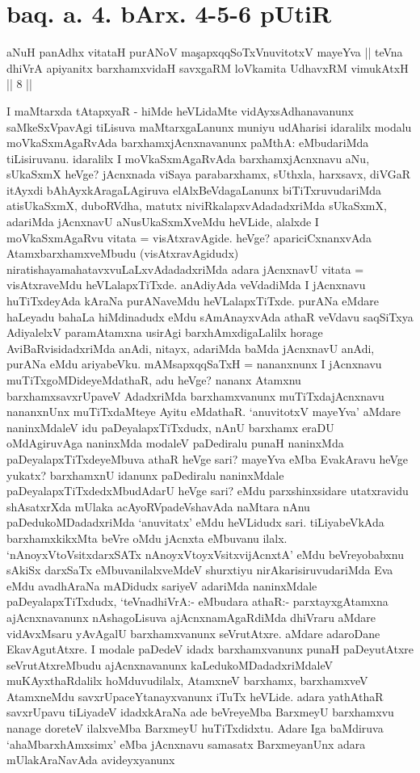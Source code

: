 \section*{baq. a. 4. bArx. 4-5-6 pUtiR}


\begin{shl}
aNuH panAdhx vitataH purANoV ma\c sapxqqSoTxV\s nuvitotxV mayeYva ||
teVna dhiVrA apiyanitx barxhamxvidaH savxgaRM loVkamita UdhavxRM vimukAtxH || 8 ||
\end{shl}

\begin{artha}
I maMtarxda tAtapxyaR - hiMde heVLidaMte vidAyxsAdhanavanunx saMkeSxVpavAgi tiLisuva maMtarxgaLanunx muniyu udAharisi idaralilx modalu moVkaSxmAgaRvAda barxhamxjAcnxnavanunx paMthA: eMbudariMda tiLisiruvanu. idaralilx I moVkaSxmAgaRvAda barxhamxjAcnxnavu aNu, sUkaSxmX heVge? jAcnxnada viSaya parabarxhamx, sUthxla, harxsavx, diVGaR itAyxdi bAhAyxkAragaLAgiruva elAlxBeVdagaLanunx biTiTxruvudariMda atisUkaSxmX, duboRVdha, matutx niviRkalapxvAdadadxriMda sUkaSxmX, adariMda jAcnxnavU aNusUkaSxmXveMdu heVLide, alalxde I moVkaSxmAgaRvu vitata = visAtxravAgide. heVge? apariciCxnanxvAda AtamxbarxhamxveMbudu (visAtxravAgidudx) niratishayamahatavxvuLaLxvAdadadxriMda adara jAcnxnavU vitata = visAtxraveMdu heVLalapxTiTxde. anAdiyAda veVdadiMda I jAcnxnavu huTiTxdeyAda kAraNa purANaveMdu heVLalapxTiTxde. purANa eMdare haLeyadu bahaLa hiMdinadudx eMdu sAmAnayxvAda athaR veVdavu saqSiTxya AdiyalelxV paramAtamxna usirAgi barxhAmxdigaLalilx horage AviBaRvisidadxriMda anAdi, nitayx, adariMda baMda jAcnxnavU anAdi, purANa eMdu ariyabeVku. mAMsapxqqSaTxH = nananxnunx I jAcnxnavu muTiTxgoMDideyeMdathaR, adu heVge? nananx Atamxnu barxhamxsavxrUpaveV AdadxriMda barxhamxvanunx muTiTxdajAcnxnavu nananxnUnx muTiTxdaMteye Ayitu eMdathaR. `anuvitotxV mayeYva' aMdare naninxMdaleV idu paDeyalapxTiTxdudx, nAnU barxhamx eraDU oMdAgiruvAga naninxMda modaleV paDediralu punaH naninxMda paDeyalapxTiTxdeyeMbuva athaR heVge sari? mayeYva eMba EvakAravu heVge yukatx? barxhamxnU idanunx paDediralu naninxMdale paDeyalapxTiTxdedxMbudAdarU heVge sari? eMdu parxshinxsidare utatxravidu shAsatxrXda mUlaka acAyoRVpadeVshavAda naMtara nAnu paDedukoMDadadxriMda `anuvitatx' eMdu heVLidudx sari. tiLiyabeVkAda barxhamxkikxMta beVre oMdu jAcnxta eMbuvanu ilalx. `nAnoyxV\s toV\s sitxdarxSATx nAnoyxVtoyxVsitxvijAcnxtA' eMdu beVreyobabxnu sAkiSx darxSaTx eMbuvanilalxveMdeV shurxtiyu nirAkarisiruvudariMda Eva eMdu avadhAraNa mADidudx sariyeV adariMda naninxMdale paDeyalapxTiTxdudx, `teVnadhiVrA:- eMbudara athaR:- parxtayxgAtamxna ajAcnxnavanunx nAshagoLisuva ajAcnxnamAgaRdiMda dhiVraru aMdare vidAvxMsaru yAvAgalU barxhamxvanunx seVrutAtxre. aMdare adaroDane EkavAgutAtxre. I modale paDedeV idadx barxhamxvanunx punaH paDeyutAtxre seVrutAtxreMbudu ajAcnxnavanunx kaLedukoMDadadxriMdaleV muKAyxthaRdalilx hoMduvudilalx, AtamxneV barxhamx, barxhamxveV AtamxneMdu savxrUpaceYtanayxvanunx iTuTx heVLide. adara yathAthaR savxrUpavu tiLiyadeV idadxkAraNa ade beVreyeMba BarxmeyU barxhamxvu nanage doreteV ilalxveMba BarxmeyU huTiTxdidxtu. Adare Iga baMdiruva `ahaMbarxhAmxsimx' eMba jAcnxnavu samasatx BarxmeyanUnx adara mUlakAraNavAda avideyxyanunx 
\end{artha}
